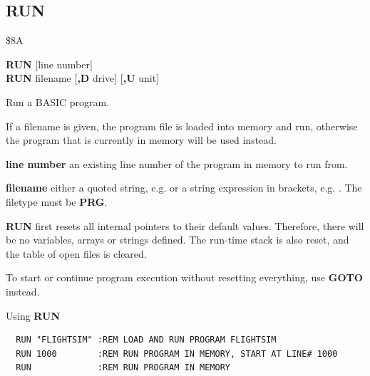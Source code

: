 
\newpage
\subsection{RUN}
\begin{description}[leftmargin=2cm,style=nextline]
\item [Token:] \$8A
\item [Format:] {\bf RUN} [line number] \\
                {\bf RUN} filename [{\bf,D} drive] [{\bf,U} unit]
\item [Usage:] Run a BASIC program.

   If a filename is given, the program file is loaded into
   memory and run, otherwise the program that is currently in memory
   will be used instead.

   {\bf line number} an existing line number of the program in memory to run from.

   {\bf filename} either a quoted string, e.g.  or
   a string expression in brackets, e.g. .
   The filetype must be {\bf PRG}.

   \drivedefinition

   \unitdefinition

   {\bf RUN} first resets all internal pointers to their
   default values. Therefore, there will be no variables, arrays
   or strings defined. The run-time stack is also reset, and the
   table of open files is cleared.

\item [Remarks:]
   To start or continue program execution without
   resetting everything, use {\bf GOTO} instead.

\item [Examples:] Using {\bf RUN}
\begin{tcolorbox}[colback=black,coltext=white]
\verbatimfont{\codefont}
\begin{verbatim}
  RUN "FLIGHTSIM" :REM LOAD AND RUN PROGRAM FLIGHTSIM
  RUN 1000        :REM RUN PROGRAM IN MEMORY, START AT LINE# 1000
  RUN             :REM RUN PROGRAM IN MEMORY
\end{verbatim}
\end{tcolorbox}
\end{description}





\newpage
